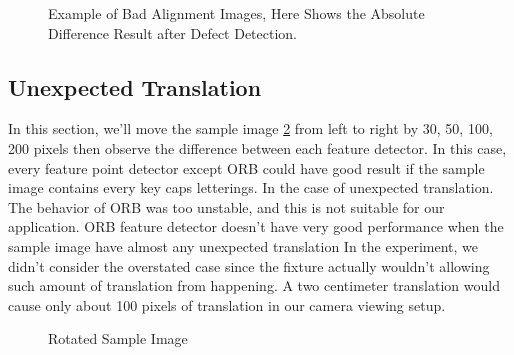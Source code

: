 		\begin{figure}[H]
			\caption{Example of Bad Alignment Images, Here Shows the Absolute Difference Result after Defect Detection.}
			\label{fig:rotatinoBadAlignmentResult}
		\end{figure}

	\subsection{Unexpected Translation}
		In this section, we'll move the sample image \ref{fig:testSamplesOfTranslation} from left to right by 30, 50, 100, 200 pixels then observe the difference between each feature detector. 
		In this case, every feature point detector except ORB could have good result if the sample image contains every key caps letterings. In the case of unexpected translation. The behavior of ORB was too unstable, and this is not suitable for our application.
		ORB feature detector doesn't have very good performance when the sample image have almost any unexpected translation
		In the experiment, we didn't consider the overstated case since the fixture actually wouldn't allowing such amount of translation from happening. 
		A two centimeter translation would cause only about 100 pixels of translation in our camera viewing setup.
		\begin{figure}[H]
			\caption{Rotated Sample Image}
			\label{fig:testSamplesOfTranslation}
		\end{figure}

